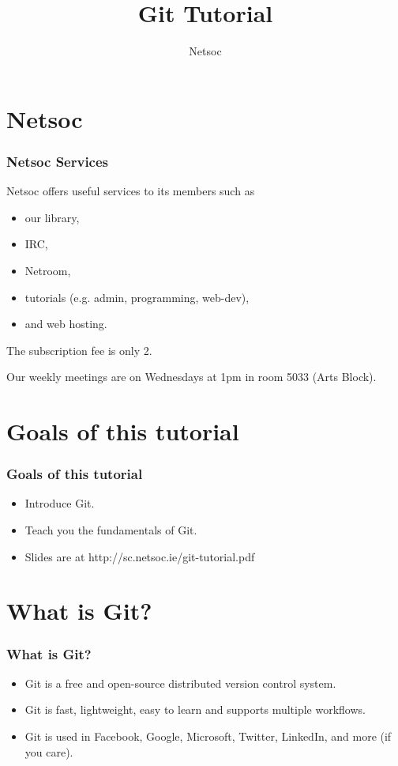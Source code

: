 \documentclass{beamer}
\title{Git Tutorial}
\author{Netsoc}
\date{}
\begin{document}
\frame{\titlepage}


\section{Netsoc}
\begin{frame}
\frametitle{Netsoc Services}
Netsoc offers useful services to its members such as
\begin{itemize}
	\pause
	\item our library,
	\pause
	\item IRC,
	\pause
	\item Netroom,
	\pause
	\item tutorials (e.g. admin, programming, web-dev),
	\pause
	\item and web hosting.
\end{itemize}
\pause

The subscription fee is only \EUR{}2.

\pause

Our weekly meetings are on Wednesdays at 1pm in room 5033 (Arts Block).
\end{frame}


\section{Goals of this tutorial}
\begin{frame}
\frametitle{Goals of this tutorial}
\begin{itemize}
\pause
\item Introduce Git.
\pause
\item Teach you the fundamentals of Git.
\pause
\item Slides are at http://sc.netsoc.ie/git-tutorial.pdf
\end{itemize}
\end{frame}


\section{What is Git?}
\begin{frame}
\frametitle{What is Git?}
\begin{itemize}
\pause
\item Git is a free and open-source distributed version control system.
\pause
\item Git is fast, lightweight, easy to learn and supports multiple workflows.
\pause
\item Git is used in Facebook, Google, Microsoft, Twitter, LinkedIn, and more
(if you care).
\end{itemize}
\end{frame}
\end{document}
